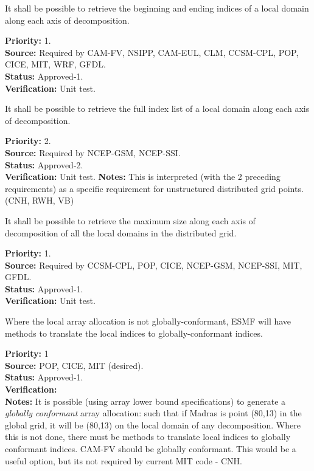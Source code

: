 
It shall be possible to retrieve the beginning and ending indices of a
local domain along each axis of decomposition.

\begin{reqlist}
{\bf Priority:} 1. \\
{\bf Source:} Required by CAM-FV, NSIPP, CAM-EUL, CLM, CCSM-CPL, POP, CICE, MIT, WRF, GFDL. \\
{\bf Status:} Approved-1. \\
{\bf Verification:} Unit test.
\end{reqlist}


It shall be possible to retrieve the full index list of a
local domain along each axis of decomposition.

\begin{reqlist}
{\bf Priority:} 2. \\ 
{\bf Source:} Required by NCEP-GSM, NCEP-SSI. \\
{\bf Status:} Approved-2. \\
{\bf Verification:} Unit test.
{\bf Notes:} This is interpreted (with the 2 preceding requirements) as
a specific requirement for unstructured distributed grid points.  (CNH, RWH, VB)
\end{reqlist}


It shall be possible to retrieve the maximum size along each axis of
decomposition of all the local domains in the distributed grid. 

\begin{reqlist}
{\bf Priority:} 1. \\
{\bf Source:} Required by CCSM-CPL, POP, CICE, NCEP-GSM, NCEP-SSI, MIT, GFDL. \\
{\bf Status:} Approved-1. \\
{\bf Verification:} Unit test.
\end{reqlist}


Where the local array allocation is not globally-conformant, 
ESMF will have methods to translate the local indices to
globally-conformant indices.

\begin{reqlist}
{\bf Priority:} 1 \\
{\bf Source:} POP, CICE, MIT (desired). \\
{\bf Status:} Approved-1. \\
{\bf Verification:} \\
{\bf Notes:} It is possible (using array lower bound specifications)
  to generate a \emph{globally conformant} array allocation: such that
  if Madras is point (80,13) in the global grid, it will be (80,13) on
  the local domain of any decomposition. Where this is not done, there
  must be methods to translate local indices to globally conformant
  indices.  CAM-FV should be globally conformant. 
  This would be a useful option, but its not
  required by current MIT code - CNH.
\end{reqlist}


